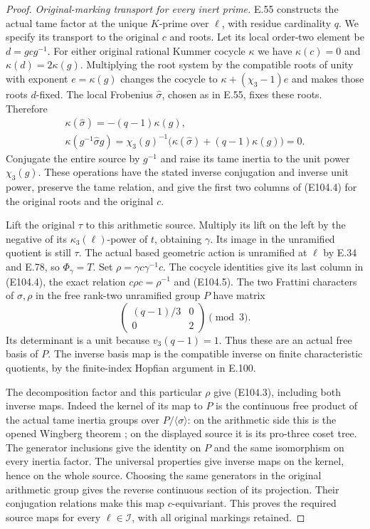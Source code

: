 \begin{proof}
\emph{Original-marking transport for every inert prime.}
E.55 constructs the actual tame factor at the unique
$K$-prime over $\ell$, with residue cardinality $q$.
We specify its transport to the original $c$ and roots.
Let its local order-two element be $d=g c g^{-1}$.
For either original rational Kummer cocycle $\kappa$
we have $\kappa(c)=0$ and
$\kappa(d)=2\kappa(g)$. Multiplying the root system
by the compatible roots of unity with exponent
$e=\kappa(g)$ changes the cocycle to
$\kappa+(\chi_3-1)e$ and makes those roots $d$-fixed.
The local Frobenius $\widehat\sigma$, chosen as
in E.55, fixes these roots. Therefore
\[
 \begin{gathered}
 \kappa(\widehat\sigma)=-(q-1)\kappa(g),\\
 \kappa(g^{-1}\widehat\sigma g)
 =\chi_3(g)^{-1}
     \bigl(\kappa(\widehat\sigma)+(q-1)\kappa(g)\bigr)=0.
 \end{gathered}
 \tag{E104.13}
\]
Conjugate the entire source by $g^{-1}$ and raise
its tame inertia to the unit power $\chi_3(g)$.
These operations have the stated inverse conjugation
and inverse unit power, preserve the tame relation,
and give the first two columns of (E104.4) for the
original roots and the original $c$.

Lift the original $\tau$ to this arithmetic source.
Multiply its lift on the left by the negative of its
$\kappa_3(\ell)$-power of $t$, obtaining $\gamma$.
Its image in the unramified quotient is still $\tau$.
The actual based geometric action is unramified at
$\ell$ by E.34 and E.78, so $\Phi_\gamma=T$.
Set $\rho=\gamma c\gamma^{-1}c$. The cocycle identities
give its last column in (E104.4), the exact relation
$c\rho c=\rho^{-1}$ and (E104.5).
The two Frattini characters of $\sigma,\rho$ in the
free rank-two unramified group $P$ have matrix
\[
 \begin{pmatrix}(q-1)/3&0\\0&2\end{pmatrix}\pmod3.
 \tag{E104.14}
\]
Its determinant is a unit because $v_3(q-1)=1$.
Thus these are an actual free basis of $P$.
The inverse basis map is the compatible inverse on
finite characteristic quotients, by the finite-index
Hopfian argument in E.100.

The decomposition factor and this particular $\rho$
give (E104.3), including both inverse maps.
Indeed the kernel of its map to $P$ is the continuous
free product of the actual tame inertia groups over
$P/\langle\sigma\rangle$: on the arithmetic side this
is the opened Wingberg theorem
\cite[Lemma1.1, Theorem2.4 and their proofs]{E_WingbergRiemann};
on the displayed source it is its pro-three coset tree.
The generator inclusions give the identity on $P$
and the same isomorphism on every inertia factor.
The universal properties give inverse maps on the
kernel, hence on the whole source. Choosing the same
generators in the original arithmetic group gives
the reverse continuous section of its projection.
Their conjugation relations make this map $c$-equivariant.
This proves the required source maps for every
$\ell\in\mathscr I$, with all original markings retained.


\end{proof}
